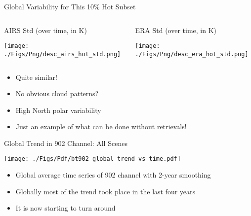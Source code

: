 \documentclass[10pt,t]{beamer}
\begin{document}
\begin{frame}[label={sec:org0822d5d}]{Global Variability for This 10\% Hot Subset}
\vspace{-0.35in}
\begin{columns}
\begin{column}{0.55\columnwidth}
\begin{block}{\small AIRS Std (over time, in K)}
\vspace{-0.1in}
\begin{center}
\texttt{[image: ./Figs/Png/desc\_airs\_hot\_std.png]}
\end{center}
\end{block}
\end{column}

\begin{column}{0.55\columnwidth}
\begin{block}{\small ERA Std (over time, in K)}
\vspace{-0.1in}
\begin{center}
\texttt{[image: ./Figs/Png/desc\_era\_hot\_std.png]}
\end{center}
\end{block}
\end{column}
\end{columns}

\begin{itemize}
\item Quite similar!
\item No obvious cloud patterns?
\item High North polar variability
\item Just an example of what can be done without retrievals!
\end{itemize}
\end{frame}

\begin{frame}[label={sec:org4cfb38f}]{Global Trend in 902 \wn Channel: All Scenes}
\vspace{-0.1in}
\begin{center}
\texttt{[image: ./Figs/Pdf/bt902\_global\_trend\_vs\_time.pdf]}
\end{center}

\vspace{-0.15in}

\begin{itemize}
\item \small Global average time series of 902 \wn channel with 2-year smoothing
\item \small Globally most of the trend took place in the last four years
\item \small It is now starting to turn around
\end{itemize}
\end{frame}
\end{document}
